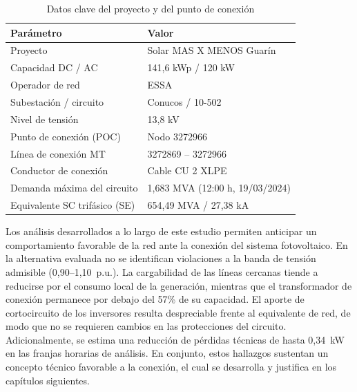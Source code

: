 \begin{table}[H]
    \centering
    \caption{Datos clave del proyecto y del punto de conexión}
    \label{tab:datos_clave}
    \begin{tabular}{ll}
    \toprule
    \textbf{Parámetro} & \textbf{Valor} \\
    \midrule
    Proyecto & Solar MAS X MENOS Guarín \\
    Capacidad DC / AC & 141,6 kWp / 120 kW \\
    Operador de red & ESSA \\
    Subestación / circuito & Conucos / 10-502 \\
    Nivel de tensión & 13,8 kV \\
    Punto de conexión (POC) & Nodo 3272966 \\
    Línea de conexión MT & 3272869 -- 3272966 \\
    Conductor de conexión & Cable CU 2 XLPE \\
    Demanda máxima del circuito & 1,683 MVA (12:00 h, 19/03/2024) \\
    Equivalente SC trifásico (SE) & 654,49 MVA / 27,38 kA \\
    \bottomrule
    \end{tabular}
\end{table}

Los análisis desarrollados a lo largo de este estudio permiten anticipar un comportamiento favorable de la red ante la conexión del sistema fotovoltaico. En la alternativa evaluada no se identifican violaciones a la banda de tensión admisible (0,90--1,10~p.u.). La cargabilidad de las líneas cercanas tiende a reducirse por el consumo local de la generación, mientras que el transformador de conexión permanece por debajo del 57\% de su capacidad. El aporte de cortocircuito de los inversores resulta despreciable frente al equivalente de red, de modo que no se requieren cambios en las protecciones del circuito. Adicionalmente, se estima una reducción de pérdidas técnicas de hasta 0,34~kW en las franjas horarias de análisis. En conjunto, estos hallazgos sustentan un concepto técnico favorable a la conexión, el cual se desarrolla y justifica en los capítulos siguientes.
